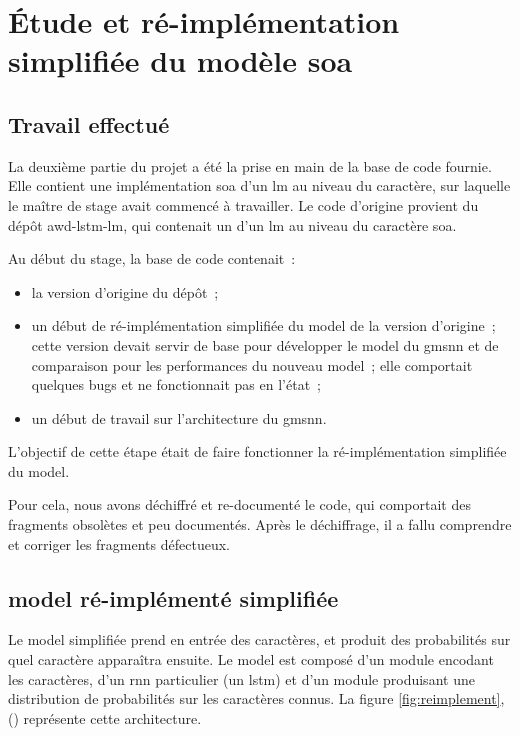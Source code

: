 \section{Étude et ré-implémentation simplifiée du modèle \gls{soa}}
\subsection{Travail effectué}\label{subsec:codebase}
La deuxième partie du projet a été la prise en main de la base de code fournie.
Elle contient une implémentation \gls{soa} d'un \gls{lm} au niveau du caractère, sur laquelle le maître de stage avait commencé à travailler.
Le code d'origine provient du dépôt \og awd-lstm-lm\fg{}\autocite{awd_source}, qui contenait un d'un \gls{lm} au niveau du caractère \gls{soa}.

Au début du stage, la base de code contenait~:
\begin{itemize}
	\item la version d'origine du dépôt~;
	\item un début de ré-implémentation simplifiée du \gls{model} de la version d'origine~; cette version  devait servir de base pour développer le \gls{model} du \gls{gmsnn} et de comparaison pour les performances du nouveau \gls{model}~; elle comportait quelques \glspl{bug} et ne fonctionnait pas en l'état~;
	\item un début de travail sur l'architecture du \gls{gmsnn}.
\end{itemize}

\vspace{1em}
L'objectif de cette étape était de faire fonctionner la ré-implémentation simplifiée du \gls{model}.

Pour cela, nous avons déchiffré et re-documenté le code, qui comportait des fragments obsolètes et peu documentés.
Après le déchiffrage, il a fallu comprendre et corriger les fragments défectueux.

\pagebreak
\subsection[\Glsentrytext{model} ré-implémenté simplifiée]{\Gls{model} ré-implémenté simplifiée} 
Le \gls{model} simplifiée prend en entrée des caractères, et produit des probabilités sur quel caractère apparaîtra ensuite.
Le \gls{model} est composé d'un module encodant les caractères, d'un \gls{rnn} particulier (un \gls{lstm}) et d'un module produisant une distribution de probabilités sur les caractères connus. La figure \ref{fig:reimplement}, () représente cette architecture.


